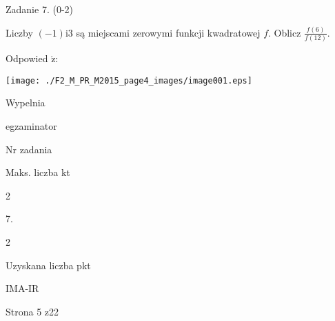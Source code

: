 \documentclass[a4paper,12pt]{article}
\begin{document}
Zadanie 7. (0-2)

Liczby $(-1) \mathrm{i}3$ są miejscami zerowymi funkcji kwadratowej $f$. Oblicz $\displaystyle \frac{f(6)}{f(12)}.$

Odpowied $\acute{\mathrm{z}}$:
\begin{center}
\texttt{[image: ./F2\_M\_PR\_M2015\_page4\_images/image001.eps]}
\end{center}
Wypelnia

egzaminator

Nr zadania

Maks. liczba kt

2

7.

2

Uzyskana liczba pkt

IMA-IR

Strona 5 z22
\end{document}
